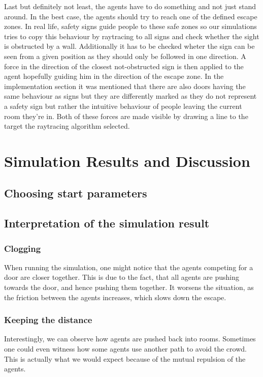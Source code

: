 \documentclass[11pt]{article}
\begin{document}
\begin{itemize}
    Last but definitely not least, the agents have to do something and not just stand around. In the best case, the agents should try to reach one of the defined escape zones. In real life, safety signs guide people to these safe zones so our simulations tries to copy this behaviour by raytracing to all signs and check whether the sight is obstructed by a wall. Additionally it has to be checked wheter the sign can be seen from a given position as they should only be followed in one direction. A force in the direction of the closest not-obstructed sign is then applied to the agent hopefully guiding him in the direction of the escape zone. In the implementation section it was mentioned that there are also doors having the same behaviour as signs but they are differently marked as they do not represent a safety sign but rather the intuitive behaviour of people leaving the current room they're in. Both of these forces are made visible by drawing a line to the target the raytracing algorithm selected.
\end{itemize}

\section{Simulation Results and Discussion}

\subsection{Choosing start parameters}

\subsection{Interpretation of the simulation result}

\subsubsection{Clogging}
When running the simulation, one might notice that the agents competing for a door are closer together. This is due to the fact, that all agents are pushing towards the door, and hence pushing them together. It worsens the situation, as the friction between the agents increases, which slows down the escape.  
    
\subsubsection{Keeping the distance}
Interestingly, we can observe how agents are pushed back into rooms. Sometimes one could even witness how some agents use another path to avoid the crowd. This is actually what we would expect because of the mutual repulsion of the agents. 
\end{document}
